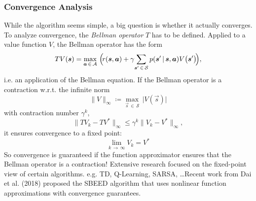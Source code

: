 			\subsubsection{Convergence Analysis}
				While the algorithm seems simple, a big question is whether it actually converges. To analyze convergence, the \emph{Bellman operator} \(T\) has to be defined. Applied to a value function \(V\), the Bellman operator has the form
				\begin{equation*}
					T V(\bm{s}) = \max_{\bm{a} \,\in\, \mathcal{A}}\, \Big(\! r(\bm{s}, \bm{a}) + \gamma \!\sum_{\bm{s}' \,\in\, \mathcal{S}} p(\bm{s}' \,\vert\, \bm{s}, \bm{a}) V\big(\bm{s}'\big) \!\Big),
				\end{equation*}
				i.e. an application of the Bellman equation. If the Bellman operator is a contraction w.r.t. the infinite norm
				\begin{equation*}
					\lVert V \rVert_\infty \coloneqq \max_{\vec{s} \,\in\, \mathcal{S}}\, \big\lvert V(\vec{s}) \big\rvert
				\end{equation*}
				with contraction number \( \gamma^k \),
				\begin{equation*}
					\big\lVert T V_k - T V^\ast \big\rVert_\infty \leq \gamma^k \big\lVert V_k - V^\ast \big\lVert_\infty,
				\end{equation*}
				it ensures convergence to a fixed point:
				\begin{equation*}
					\lim\limits_{k \,\to\, \infty} V_k = V^\ast
				\end{equation*}
				So convergence is guaranteed if the function approximator ensures that the Bellman operator is a contraction! Extensive research focused on the fixed-point view of certain algorithms. e.g. TD, Q-Learning, SARSA, \dots Recent work from Dai et al. (2018) proposed the SBEED algorithm that uses nonlinear function approximations with convergence guarantees.


